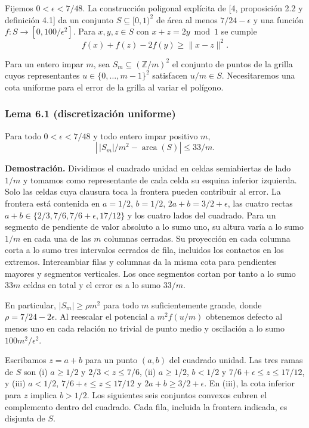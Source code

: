 \documentclass[spanish,11pt,a4paper]{article}
\begin{document}
Fijemos \(0<\epsilon<7/48\). La construcción poligonal explícita de {[}4, proposición 2.2 y definición 4.1{]} da un conjunto \(S\subseteq[0,1)^2\) de área al menos \(7/24-\epsilon\) y una función \(f:S\to[0,100/\epsilon^2]\). Para \(x,y,z\in S\) con \(x+z=2y\bmod1\) se cumple
\[f(x)+f(z)-2f(y)\ge\|x-z\|^2.\]

Para un entero impar \(m\), sea \(S_m\subseteq(\mathbb Z/m)^2\) el conjunto de puntos de la grilla cuyos representantes \(u\in\{0,\ldots,m-1\}^2\) satisfacen \(u/m\in S\). Necesitaremos una cota uniforme para el error de la grilla al variar el polígono.

\subsubsection{Lema 6.1 (discretización uniforme)}\label{lema-6.1-discretizaciuxf3n-uniforme}

Para todo \(0<\epsilon<7/48\) y todo entero impar positivo \(m\),
\[\left|\,|S_m|/m^2-\operatorname{area}(S)\right|\le 33/m.\]

\textbf{Demostración.} Dividimos el cuadrado unidad en celdas semiabiertas de lado \(1/m\) y tomamos como representante de cada celda su esquina inferior izquierda. Solo las celdas cuya clausura toca la frontera pueden contribuir al error. La frontera está contenida en \(a=1/2\), \(b=1/2\), \(2a+b=3/2+\epsilon\), las cuatro rectas \(a+b\in\{2/3,7/6,7/6+\epsilon,17/12\}\) y los cuatro lados del cuadrado. Para un segmento de pendiente de valor absoluto a lo sumo uno, su altura varía a lo sumo \(1/m\) en cada una de las \(m\) columnas cerradas. Su proyección en cada columna corta a lo sumo tres intervalos cerrados de fila, incluidos los contactos en los extremos. Intercambiar filas y columnas da la misma cota para pendientes mayores y segmentos verticales. Los once segmentos cortan por tanto a lo sumo \(33m\) celdas en total y el error es a lo sumo \(33/m\).

En particular, \(|S_m|\ge\rho m^2\) para todo \(m\) suficientemente grande, donde \(\rho=7/24-2\epsilon\). Al reescalar el potencial a \(m^2 f(u/m)\) obtenemos defecto al menos uno en cada relación no trivial de punto medio y oscilación a lo sumo \(100m^2/\epsilon^2\).

Escribamos \(z=a+b\) para un punto \((a,b)\) del cuadrado unidad. Las tres ramas de \(S\) son (i) \(a\ge1/2\) y \(2/3<z\le7/6\), (ii) \(a\ge1/2\), \(b<1/2\) y \(7/6+\epsilon\le z\le17/12\), y (iii) \(a<1/2\), \(7/6+\epsilon\le z\le17/12\) y \(2a+b\ge3/2+\epsilon\). En (iii), la cota inferior para \(z\) implica \(b>1/2\). Los siguientes seis conjuntos convexos cubren el complemento dentro del cuadrado. Cada fila, incluida la frontera indicada, es disjunta de \(S\).
\end{document}
